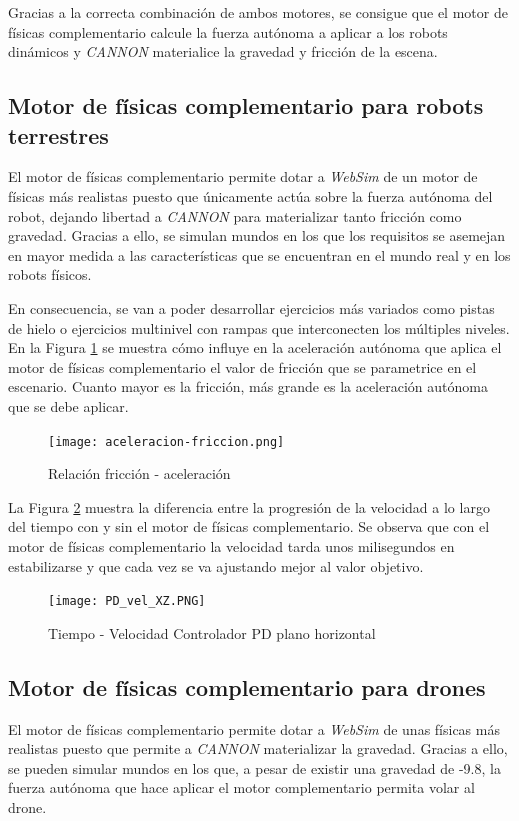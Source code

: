 \normalsize
Gracias a la correcta combinación de ambos motores, se consigue que el motor de físicas complementario calcule la fuerza autónoma a aplicar a los robots dinámicos y \textit{CANNON} materialice la gravedad y fricción de la escena.

\subsection{Motor de físicas complementario para robots terrestres}
El motor de físicas complementario permite dotar a \textit{WebSim} de un motor de físicas más realistas puesto que únicamente actúa sobre la fuerza autónoma del robot, dejando libertad a \textit{CANNON} para materializar tanto fricción como gravedad. Gracias a ello, se simulan mundos en los que los requisitos se asemejan en mayor medida a las características que se encuentran en el mundo real y en los robots físicos. \newline

En consecuencia, se van a poder desarrollar ejercicios más variados como pistas de hielo o ejercicios multinivel con rampas que interconecten los múltiples niveles. En la Figura \ref{fig:friccion-acele} se muestra cómo influye en la aceleración autónoma que aplica el motor de físicas complementario el valor de fricción que se parametrice en el escenario. Cuanto mayor es la fricción, más grande es la aceleración autónoma que se debe aplicar.

\begin{figure}[h!]
    \centering
    \texttt{[image: aceleracion-friccion.png]}
    \caption{Relación fricción - aceleración}
    \label{fig:friccion-acele}
\end{figure}

La Figura \ref{fig:vel-planoXZ} muestra la diferencia entre la progresión de la velocidad a lo largo del tiempo con y sin el motor de físicas complementario. Se observa que con el motor de físicas complementario la velocidad tarda unos milisegundos en estabilizarse y que cada vez se va ajustando mejor al valor objetivo.

\begin{figure}[h!]
    \centering
    \texttt{[image: PD\_vel\_XZ.PNG]}
    \caption{Tiempo - Velocidad Controlador PD plano horizontal}
    \label{fig:vel-planoXZ}
\end{figure}


\subsection{Motor de físicas complementario para drones}
El motor de físicas complementario permite dotar a \textit{WebSim} de unas físicas más realistas puesto que permite a \textit{CANNON} materializar la gravedad. Gracias a ello, se pueden simular mundos en los que, a pesar de existir una gravedad de -9.8, la fuerza autónoma que hace aplicar el motor complementario permita volar al drone. \newline

